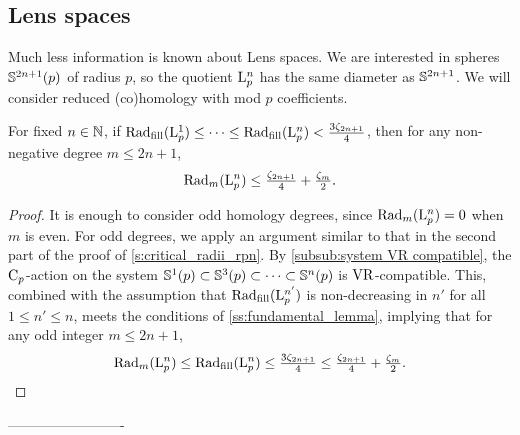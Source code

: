 \subsection{Lens spaces}\label{s:critical_radii_lens}

Much less information is known about Lens spaces.
We are interested in spheres \(\mathbb{S}^{2n+1}(p)\) of radius \(p\), so the quotient \(\mathrm{L}_p^n\) has the same diameter as \(\mathbb{S}^{2n+1}\).
We will consider reduced (co)homology with mod \(p\) coefficients.

\medskip\lemma 
For fixed $n\in \mathbb{N}$, if $\mathrm{Rad}_{\mathrm{fill}}(\mathrm{L}^1_p) \leq \dotsb \leq \mathrm{Rad}_{\mathrm{fill}}(\mathrm{L}^n_p) < \tfrac{3\zeta_{2n+1}}{4}$, then for any non-negative degree $m\leq 2n+1$, 
\[
\mathrm{Rad}_{m}(\mathrm{L}^n_p) \leq \tfrac{\zeta_{2n+1}}{4} + \tfrac{\zeta_{m}}{2}.
\]

\begin{proof}
    It is enough to consider odd homology degrees, since $\mathrm{Rad}_{m}(\mathrm{L}^n_p) = 0$ when $m$ is even.
    For odd degrees, we apply an argument similar to that in the second part of the proof of \cref{s:critical_radii_rpn}.
    By \cref{subsub:system VR compatible}, the $\mathrm{C}_p$-action on the system $\mathbb{S}^1(p) \subset \mathbb{S}^3(p) \subset \dotsb \subset \mathbb{S}^n (p)$ is \(\mathrm{VR}\)-compatible. 
    This, combined with the assumption that $\mathrm{Rad}_{\mathrm{fill}}(\mathrm{L}^{n'}_p)$ is non-decreasing in $n'$ for all $1\leq n' \leq n$, meets the conditions of \cref{ss:fundamental_lemma}, implying that for any odd integer $m \leq 2n+1$,
    \[
    \mathrm{Rad}_{m}(\mathrm{L}^n_p) \leq \mathrm{Rad}_{\mathrm{fill}}(\mathrm{L}^n_p) \leq \tfrac{3\zeta_{2n+1}}{4} \leq \tfrac{\zeta_{2n+1}}{4} + \tfrac{\zeta_{m}}{2}. \qedhere
    \]
\end{proof}


-------------------------